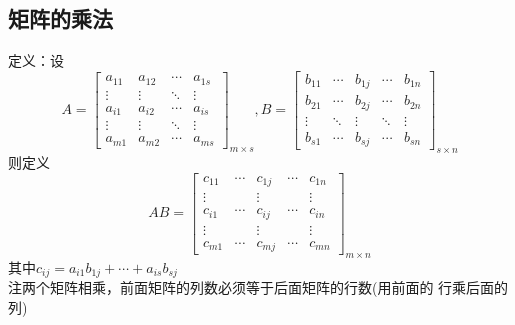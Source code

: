 \subsection{矩阵的乘法}
{\color{blue}定义：\quad}设
$$
A=\left[ \begin{matrix}
    {{a}_{11}} & {{a}_{12}} & \cdots  & {{a}_{1s}}  \\
    \vdots  & \vdots  & {\ddots} & \vdots   \\
    {{a}_{i1}} & {{a}_{i2}} & \cdots  & {{a}_{is}}  \\
    \vdots  & \vdots  & {\ddots} & \vdots   \\
    {{a}_{m1}} & {{a}_{m2}} & \cdots  & {{a}_{ms}}       
\end{matrix} \right]_{m\times s},
B=\left[ \begin{matrix}
    {{b}_{11}} & \cdots  & {{b}_{1j}} & \cdots  & {{b}_{1n}}  \\
   {{b}_{21}} & \cdots  & {{b}_{2j}} & \cdots  & {{b}_{2n}}  \\
   \vdots  & {\ddots} & \vdots  & {\ddots} & \vdots   \\
   {{b}_{s1}} & \cdots  & {{b}_{sj}} & \cdots  & {{b}_{sn}}
\end{matrix} \right]_{s\times n}
$$
则{\color{red}定义}
$$
AB=\left[ \begin{matrix}
    {{c}_{11}} & \cdots  & {{c}_{1j}} & \cdots  & {{c}_{1n}}  \\
   \vdots  & {} & \vdots  & {} & \vdots   \\
   {{c}_{i1}} & \cdots  & {{c}_{ij}} & \cdots  & {{c}_{in}}  \\
   \vdots  & {} & \vdots  & {} & \vdots   \\
   {{c}_{m1}} & \cdots  & {{c}_{mj}} & \cdots  & {{c}_{mn}}      
\end{matrix} \right]_{m\times n}
$$
其中${{c}_{ij}}={{a}_{i1}}{{b}_{1j}}+\cdots +{{a}_{is}}{{b}_{sj}}$ \\
{\color{red}注\quad}两个矩阵相乘，前面矩阵的列数必须等于后面矩阵的行数(用前面的
行乘后面的列) \\
